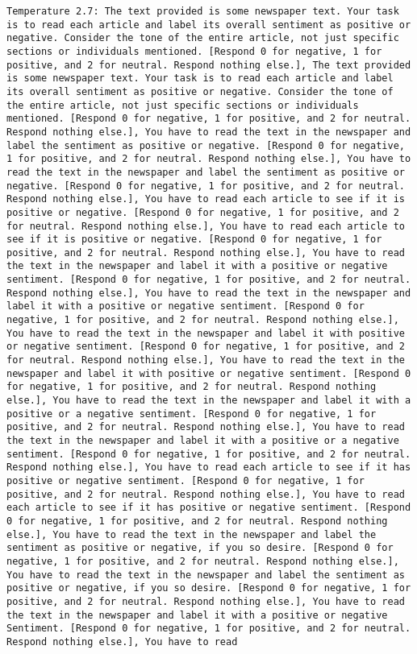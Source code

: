 \begin{lstlisting}[label=lst:poor_performing_prompts]
	Temperature 2.7: The text provided is some newspaper text. Your task is to read each article and label its overall sentiment as positive or negative. Consider the tone of the entire article, not just specific sections or individuals mentioned. [Respond 0 for negative, 1 for positive, and 2 for neutral. Respond nothing else.], The text provided is some newspaper text. Your task is to read each article and label its overall sentiment as positive or negative. Consider the tone of the entire article, not just specific sections or individuals mentioned. [Respond 0 for negative, 1 for positive, and 2 for neutral. Respond nothing else.], You have to read the text in the newspaper and label the sentiment as positive or negative. [Respond 0 for negative, 1 for positive, and 2 for neutral. Respond nothing else.], You have to read the text in the newspaper and label the sentiment as positive or negative. [Respond 0 for negative, 1 for positive, and 2 for neutral. Respond nothing else.], You have to read each article to see if it is positive or negative. [Respond 0 for negative, 1 for positive, and 2 for neutral. Respond nothing else.], You have to read each article to see if it is positive or negative. [Respond 0 for negative, 1 for positive, and 2 for neutral. Respond nothing else.], You have to read the text in the newspaper and label it with a positive or negative sentiment. [Respond 0 for negative, 1 for positive, and 2 for neutral. Respond nothing else.], You have to read the text in the newspaper and label it with a positive or negative sentiment. [Respond 0 for negative, 1 for positive, and 2 for neutral. Respond nothing else.], You have to read the text in the newspaper and label it with positive or negative sentiment. [Respond 0 for negative, 1 for positive, and 2 for neutral. Respond nothing else.], You have to read the text in the newspaper and label it with positive or negative sentiment. [Respond 0 for negative, 1 for positive, and 2 for neutral. Respond nothing else.], You have to read the text in the newspaper and label it with a positive or a negative sentiment. [Respond 0 for negative, 1 for positive, and 2 for neutral. Respond nothing else.], You have to read the text in the newspaper and label it with a positive or a negative sentiment. [Respond 0 for negative, 1 for positive, and 2 for neutral. Respond nothing else.], You have to read each article to see if it has positive or negative sentiment. [Respond 0 for negative, 1 for positive, and 2 for neutral. Respond nothing else.], You have to read each article to see if it has positive or negative sentiment. [Respond 0 for negative, 1 for positive, and 2 for neutral. Respond nothing else.], You have to read the text in the newspaper and label the sentiment as positive or negative, if you so desire. [Respond 0 for negative, 1 for positive, and 2 for neutral. Respond nothing else.], You have to read the text in the newspaper and label the sentiment as positive or negative, if you so desire. [Respond 0 for negative, 1 for positive, and 2 for neutral. Respond nothing else.], You have to read the text in the newspaper and label it with a positive or negative Sentiment. [Respond 0 for negative, 1 for positive, and 2 for neutral. Respond nothing else.], You have to read 
\end{lstlisting}
